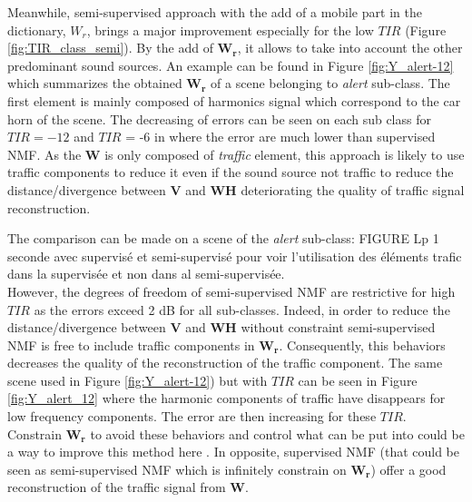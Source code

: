 \documentclass[twocolumn,a4paper,10pt]{article}
\begin{document}
Meanwhile, semi-supervised approach with the add of a mobile part in the dictionary, $W_r$, brings a major improvement especially for the low $TIR$ (Figure \ref{fig:TIR_class_semi}). By the add of $\mathbf{W_r}$, it allows to take into account the other predominant sound sources. An example can be found in Figure \ref{fig:Y_alert-12} which summarizes the obtained $\mathbf{W_r}$ of a scene belonging to \textit{alert} sub-class. The first element is mainly composed of harmonics signal which correspond to the car horn of the scene. The decreasing of errors can be seen on each sub class for $TIR = -12$ and $TIR$ = -6 in  where the error are much lower than supervised NMF.
As the $\mathbf{W}$ is only composed of \textit{traffic} element, this approach is likely to use traffic components to reduce it even if the sound source not traffic to reduce the distance/divergence between $\mathbf{V}$ and $\mathbf{WH}$ deteriorating the quality of traffic signal reconstruction.

The comparison can be made on a scene of the \textit{alert} sub-class:
FIGURE Lp 1 seconde avec supervisé et semi-supervisé pour voir l'utilisation des éléments trafic dans la supervisée et non dans al semi-supervisée. \\

However, the degrees of freedom of semi-supervised NMF are restrictive for high $TIR$ as the errors exceed 2 dB for all sub-classes. Indeed, in order to reduce the distance/divergence between $\mathbf{V}$ and $\mathbf{WH}$ without constraint semi-supervised NMF is free to include traffic components in $\mathbf{W_r}$. Consequently, this behaviors decreases the quality of the reconstruction of the traffic component. The same scene used in Figure \ref{fig:Y_alert-12}) but with $TIR$ can be seen in Figure \ref{fig:Y_alert_12} where the harmonic components of traffic have disappears for low frequency components. The error are then increasing for these $TIR$. Constrain $\mathbf{W_r}$ to avoid these behaviors and control what can be put into could be a way to improve this method here \cite{kitamura_music_2014}. In opposite, supervised NMF (that could be seen as semi-supervised NMF which is infinitely constrain on $\mathbf{W_r}$) offer a good reconstruction of the traffic signal from $\mathbf{W}$.\\
\end{document}
